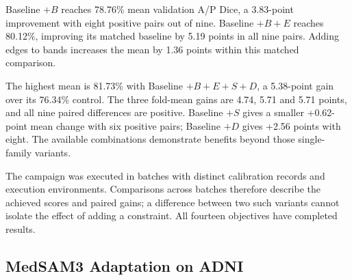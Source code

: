 \documentclass[12pt,a4paper]{article}
\begin{document}
Baseline $+B$ reaches 78.76\% mean validation A/P Dice, a 3.83-point improvement
with eight positive pairs out of nine. Baseline $+B+E$ reaches 80.12\%,
improving its matched baseline by 5.19 points in all nine pairs.
Adding edges to bands increases the mean by 1.36 points within this
matched comparison.

The highest mean is 81.73\% with Baseline $+B+E+S+D$, a 5.38-point
gain over its 76.34\% control. The three fold-mean gains are 4.74,
5.71 and 5.71 points, and all nine paired differences are positive.
Baseline $+S$ gives a smaller +0.62-point mean change with six positive
pairs; Baseline $+D$ gives +2.56 points with eight. The available
combinations demonstrate benefits beyond those single-family variants.

The campaign was executed in batches with distinct calibration records
and execution environments. Comparisons across batches therefore
describe the achieved scores and paired gains; a difference between two
such variants cannot isolate the effect of adding a constraint.
All fourteen objectives have completed results.

\FloatBarrier
\subsection{MedSAM3 Adaptation on ADNI}
\label{sec:medsam-adni-results}
\end{document}
